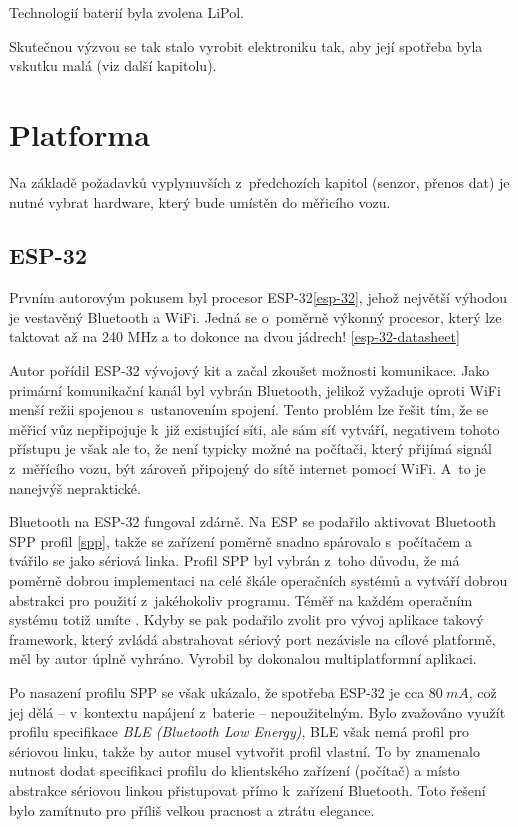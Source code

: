 Technologií baterií byla zvolena LiPol.

Skutečnou výzvou se tak stalo vyrobit elektroniku tak, aby její spotřeba
byla vskutku malá (viz další kapitolu).

\section{Platforma}
\label{sec:wsm-platforma}

Na základě požadavků vyplynuvších z~předchozích kapitol (senzor, přenos dat)
je nutné vybrat hardware, který bude umístěn do měřicího vozu.

\subsection{ESP-32}
\label{subsec:wsm-esp32}

Prvním autorovým pokusem byl procesor ESP-32\ref{esp-32}, jehož největší
výhodou je vestavěný Bluetooth a WiFi. Jedná se o~poměrně výkonný procesor,
který lze taktovat až na 240 MHz a to dokonce na dvou jádrech!
\ref{esp-32-datasheet}

Autor pořídil ESP-32 vývojový kit a začal zkoušet možnosti komunikace. Jako
primární komunikační kanál byl vybrán Bluetooth, jelikož vyžaduje oproti
WiFi menší režii spojenou s~ustanovením spojení. Tento problém lze řešit tím,
že se měřicí vůz nepřipojuje k~již existující síti, ale sám síť vytváří,
negativem tohoto přístupu je však ale to, že není typicky možné na počítači,
který přijímá signál z~měřícího vozu, být zároveň připojený do sítě internet
pomocí WiFi. A~to je nanejvýš nepraktické.

Bluetooth na ESP-32 fungoval zdárně. Na ESP se podařilo aktivovat Bluetooth SPP
profil \ref{spp}, takže se zařízení poměrně snadno spárovalo s~počítačem a
tvářilo se jako sériová linka. Profil SPP byl vybrán z~toho důvodu, že má
poměrně dobrou implementaci na celé škále operačních systémů a vytváří dobrou
abstrakci pro použití z~jakéhokoliv programu. Téměř na každém operačním systému
totiž umíte . Kdyby se pak podařilo zvolit pro vývoj
aplikace takový framework, který zvládá abstrahovat sériový port nezávisle na
cílové platformě, měl by autor úplně vyhráno. Vyrobil by dokonalou
multiplatformní aplikaci.

Po nasazení profilu SPP se však ukázalo, že spotřeba ESP-32 je cca $80\ mA$,
což jej dělá -- v~kontextu napájení z~baterie -- nepoužitelným. Bylo zvažováno
využít profilu specifikace \textit{BLE (Bluetooth Low Energy)}, BLE však nemá
profil pro sériovou linku, takže by autor musel vytvořit profil vlastní. To
by znamenalo nutnost dodat specifikaci profilu do klientského zařízení (počítač)
a místo abstrakce sériovou linkou přistupovat přímo k~zařízení Bluetooth.
Toto řešení bylo zamítnuto pro příliš velkou pracnost a ztrátu elegance.

